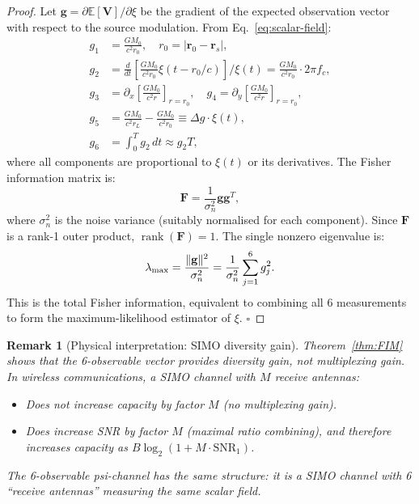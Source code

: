 \documentclass[aps,prd,twocolumn,superscriptaddress,nofootinbib]{revtex4-2}
\newcommand{\SNR}{\mathrm{SNR}}
\DeclareMathOperator{\rank}{rank}
\newtheorem{remark}{Remark}
\begin{document}
\begin{proof}
Let $\mathbf{g} = \partial \mathbb{E}[\mathbf{V}]/\partial \xi$ be the gradient
of the expected observation vector with respect to the source modulation.
From Eq.~\eqref{eq:scalar-field}:
\begin{align}
g_1 &= \frac{G M_0}{c^2 r_0}, \quad r_0 = |\mathbf{r}_0 - \mathbf{r}_s|,
\label{eq:g1}\\
g_2 &= \frac{d}{dt}\left[\frac{G M_0}{c^2 r_0}\xi(t-r_0/c)\right]
    \bigg/\xi(t) = \frac{G M_0}{c^2 r_0} \cdot 2\pi f_c,
\label{eq:g2}\\
g_3 &= \partial_x\left[\frac{G M_0}{c^2 r}\right]_{r=r_0}, \quad
g_4 = \partial_y\left[\frac{G M_0}{c^2 r}\right]_{r=r_0},
\label{eq:g34}\\
g_5 &= \frac{G M_0}{c^2 r_L} - \frac{G M_0}{c^2 r_0}
    \equiv \Delta g \cdot \xi(t),
\label{eq:g5}\\
g_6 &= \int_0^T g_2\,dt \approx g_2 T,
\label{eq:g6}
\end{align}
where all components are proportional to $\xi(t)$ or its derivatives.
The Fisher information matrix is:
\begin{equation}
\mathbf{F} = \frac{1}{\sigma_n^2}\mathbf{g}\mathbf{g}^T,
\label{eq:FIM-outer-product}
\end{equation}
where $\sigma_n^2$ is the noise variance (suitably normalised for each
component). Since $\mathbf{F}$ is a rank-1 outer product,
$\rank(\mathbf{F}) = 1$. The single nonzero eigenvalue is:
\begin{equation}
\lambda_{\rm max} = \frac{\|\mathbf{g}\|^2}{\sigma_n^2}
= \frac{1}{\sigma_n^2}\sum_{j=1}^{6} g_j^2.
\label{eq:lambda-max}
\end{equation}
This is the total Fisher information, equivalent to combining all 6
measurements to form the maximum-likelihood estimator of $\xi$. $\square$
\end{proof}

\begin{remark}[Physical interpretation: SIMO diversity gain]
\label{rem:SIMO}
Theorem~\ref{thm:FIM} shows that the 6-observable vector provides
\emph{diversity gain}, not \emph{multiplexing gain}. In wireless
communications, a SIMO channel with $M$ receive antennas:
\begin{itemize}
\item Does \emph{not} increase capacity by factor $M$ (no multiplexing gain).
\item Does increase SNR by factor $M$ (maximal ratio combining), and
  therefore increases capacity as $B\log_2(1 + M\cdot\SNR_1)$.
\end{itemize}
The 6-observable psi-channel has the same structure: it is a SIMO channel
with 6 ``receive antennas'' measuring the same scalar field.
\end{remark}
\end{document}
